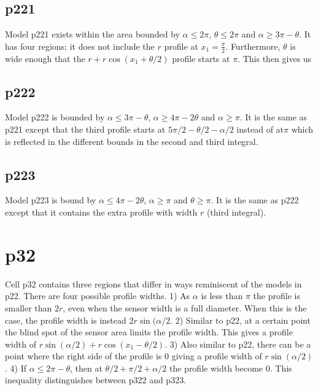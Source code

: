 \subsection{p221} \label{p221}

Model p221 exists within the area bounded by $\alpha\le2\pi$, $\theta\le2\pi$ and $\alpha \ge 3\pi - \theta$. It has four regions; it does not include the $r$ profile at $x_1=\frac{\pi}{2}$. Furthermore, $\theta$ is wide enough that the $r + r\cos(x_1 + \theta/2)$ profile starts at $\pi$. This then gives us




\subsection{p222} \label{p222}

Model p222 is bounded by $\alpha \le 3\pi - \theta$, $\alpha \ge 4\pi - 2\theta$ and $\alpha \ge \pi$. It is the same as p221 except that the third profile starts at $5\pi/2 - \theta/2 - \alpha/2$ instead of at$\pi$ which is reflected in the different bounds in the second and third integral.



\subsection{p223} \label{p223}

Model p223 is bound by $\alpha \le 4\pi - 2\theta$, $\alpha \ge \pi$ and $\theta \ge \pi$. It is the same as p222 except that it contains the extra profile with width $r$ (third integral).



\section{p32} \label{p32}

Cell p32 contains three regions that differ in ways reminiscent of the models in p22. There are four possible profile widths. 1) As $\alpha$ is less than $\pi$ the profile is smaller than $2r$, even when the sensor width is a full diameter. When this is the case, the profile width is instead $2r\sin(\alpha/2$. 2) Similar to p22, at a certain point the blind spot of the sensor area limits the profile width. This gives a profile width of $r\sin(\alpha/2) + r\cos(x_1 - \theta/2)$. 3) Also similar to p22, there can be a point where the right side of the profile is 0 giving a profile width of $r\sin(\alpha/2)$. 4) If $\alpha \le 2\pi - \theta$, then at $\theta/2 + \pi/2 + \alpha/2 $ the profile width become 0. This inequality distinguishes between p322 and p323. 

